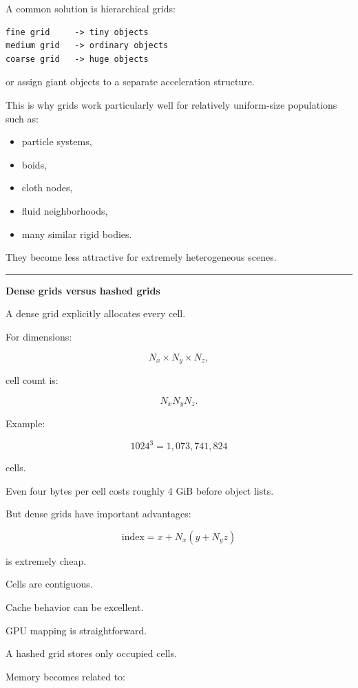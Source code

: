 A common solution is hierarchical grids:

\begin{verbatim}
fine grid     -> tiny objects
medium grid   -> ordinary objects
coarse grid   -> huge objects
\end{verbatim}

or assign giant objects to a separate acceleration structure.

This is why grids work particularly well for relatively uniform-size populations such as:

\begin{itemize}
\tightlist
\item
  particle systems,
\item
  boids,
\item
  cloth nodes,
\item
  fluid neighborhoods,
\item
  many similar rigid bodies.
\end{itemize}

They become less attractive for extremely heterogeneous scenes.

\begin{center}\rule{0.5\linewidth}{0.5pt}\end{center}

\textbf{Dense grids versus hashed grids}

A dense grid explicitly allocates every cell.

For dimensions:

\[
N_x\times N_y\times N_z,
\]

cell count is:

\[
N_xN_yN_z.
\]

Example:

\[
1024^3
=
1,073,741,824
\]

cells.

Even four bytes per cell costs roughly 4 GiB before object lists.

But dense grids have important advantages:

\[
\text{index}
=
x+N_x(y+N_yz)
\]

is extremely cheap.

Cells are contiguous.

Cache behavior can be excellent.

GPU mapping is straightforward.

A hashed grid stores only occupied cells.

Memory becomes related to:

